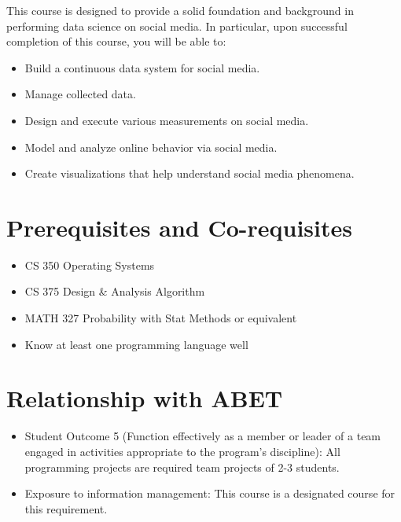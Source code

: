 \documentclass[11pt,article,oneside]{memoir} %
\begin{document}
This course is designed to provide a solid foundation and background in performing data science on social media.
In particular, upon successful completion of this course, you will be able to:

\begin{itemize}
    \item Build a continuous data system for social media.
    \item Manage collected data.
    \item Design and execute various measurements on social media.
    \item Model and analyze online behavior via social media.
    \item Create visualizations that help understand social media phenomena.
\end{itemize}



\section{Prerequisites and Co-requisites}%
\label{sec:Prerequisites}

\begin{itemize}
    \item CS 350 Operating Systems
    \item CS 375 Design \& Analysis Algorithm
    \item MATH 327 Probability with Stat Methods or equivalent
    \item Know at least one programming language well
\end{itemize}


\section{Relationship with ABET}%

\begin{itemize}
    \item Student Outcome 5 (Function effectively as a member or leader of a team engaged in
    activities appropriate to the program's discipline): All programming projects are required
    team projects of 2-3 students.
    \item Exposure to information management: This course is a designated course for this
    requirement.
\end{itemize}
\end{document}
